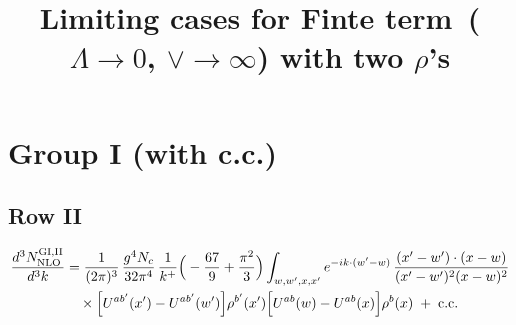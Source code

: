 \documentclass[9pt]{article}
\title{Limiting cases for Finte term\, ($\Lambda\to 0$, $\vee\to \infty$) with two $\rho$'s}
\author{}
\date{}
\numberwithin{equation}{section}
\begin{document}
\maketitle
\section{Group I (with c.c.)}
\subsection{Row II}
\begin{align}
\frac{d^{3}N^{\rm GI,II}_{\rm NLO}}{d^{3}k}&=\frac{1}{(2\pi)^{3}}\,\frac{g^{4}N_{c}}{32\pi^{4}}\,\frac{1}{k^{+}}\Big(-\frac{67}{9}+\frac{\pi^{2}}{3}\Big)\int_{w,w^{\prime},x,x^{\prime}}e^{-ik\cdot(w^{\prime}-w)}\,\frac{(x^{\prime}-w^{\prime})\cdot(x-w)}{(x^{\prime}-w^{\prime})^{2}(x-w)^{2}}\notag\\&\quad\times\Big[U^{ab^{\prime}}(x^{\prime})-U^{ab^{\prime}}(w^{\prime})\Big]\rho^{b^{\prime}}(x^{\prime})\Big[U^{ab}(w)-U^{ab}(x)\Big]\rho^{b}(x)\;+\;{\rm c.c.}
\end{align}
\end{document}
